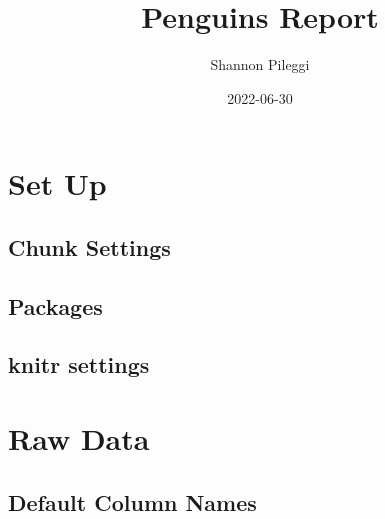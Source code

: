 \documentclass[
  landscape]{article}
\title{Penguins Report}
\author{Shannon Pileggi}
\date{2022-06-30}
\begin{document}
\maketitle

\newpage{}

{
\setcounter{tocdepth}{2}
\tableofcontents
}
\let\oldsection\section
\renewcommand\section{\clearpage\oldsection}

\hypertarget{set-up}{%
\section{Set Up}\label{set-up}}

\hypertarget{chunk-settings}{%
\subsection{Chunk Settings}\label{chunk-settings}}

\hypertarget{packages}{%
\subsection{Packages}\label{packages}}

\hypertarget{knitr-settings}{%
\subsection{knitr settings}\label{knitr-settings}}

\hypertarget{raw-data}{%
\section{Raw Data}\label{raw-data}}

\hypertarget{default-column-names}{%
\subsection{Default Column Names}\label{default-column-names}}
\end{document}
